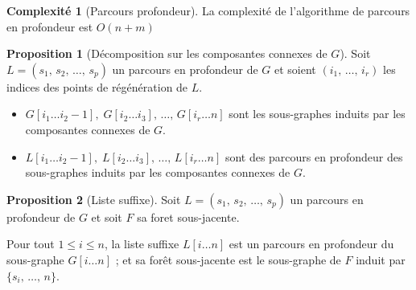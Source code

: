 \documentclass[11pt,english,french]{scrreprt}
\theoremstyle{remark}
\theoremstyle{definition}
\newtheorem*{prop*}{Proposition}
\newtheorem*{comp*}{Complexité}
\begin{document}
\begin{algorithm} 
	\DontPrintSemicolon 
	\caption{Parcours en profondeur} 
\end{algorithm}

\begin{comp*}[Parcours profondeur]
	La complexité de l'algorithme de parcours en profondeur est $O(n+m)$
\end{comp*}

\begin{prop*}[Décomposition sur les composantes connexes de $G$]
	Soit $L=(s_1,\,s_2,\,\dots,\,s_p)$ un parcours en profondeur de $G$ et soient $(i_1,\,\dots,\,i_r)$ les indices des points de régénération de $L$.
	\begin{itemize}
			\item $G[i_1\dots i_2-1],\;G[i_2\dots i_3],\,\dots,\,G[i_r\dots n]$ sont les sous-graphes induits par les composantes connexes de $G$.
			\item $L[i_1\dots i_2-1],\;L[i_2\dots i_3],\,\dots,\,L[i_r\dots n]$ sont des parcours en profondeur des sous-graphes induits par les composantes connexes de $G$.
	\end{itemize}
\end{prop*}

\begin{prop*}[Liste suffixe]
	Soit $L=(s_1,\,s_2,\,\dots,\,s_p)$ un parcours en profondeur de $G$ et soit $F$ sa foret sous-jacente.
	
	Pour tout $1\leqslant i\leqslant n$, la liste suffixe $L[i\dots n]$ est un parcours en profondeur du sous-graphe $G[i\dots n]$ ; et sa forêt sous-jacente est le sous-graphe de $F$ induit par $\{s_i,\,\dots,\,n\}$.
\end{prop*}
\end{document}
